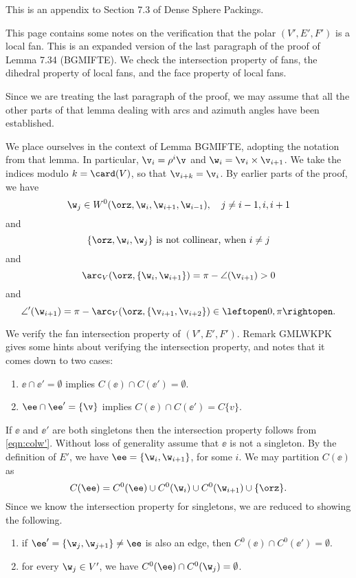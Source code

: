 \newpage
{}

This is an appendix to Section 7.3 of Dense Sphere Packings.

This page contains some notes on the verification that the polar $(V',E',F')$ is
a local fan.   This is an expanded version of  the last paragraph
of the proof of Lemma 7.34 (BGMIFTE).
We check the intersection property of fans, the dihedral property
of local fans, and the face property of local fans.

Since we are treating the last paragraph of the
proof, we may assume that all the other parts of that lemma dealing
with arcs and azimuth angles have been established.

We place ourselves in the context of Lemma BGMIFTE, adopting the
notation from that lemma.  
In particular, $\v_i = \rho^i\v$ and
$\w_i = \v_i \times \v_{i+1}$.  
We take the indices modulo $k=\card(V)$, so that $\v_{i+k}=\v_i$.
By earlier parts of the proof, we have
\begin{equation}\label{eqn:wj'}
\w_j\in W^0(\orz,\w_{i},\w_{i+1},\w_{i-1}),\quad j\ne i-1, i, i+1
\end{equation}
and
\begin{equation}\label{eqn:colw'}
\{\orz,\w_i,\w_j\} \text{ is not collinear, when } i\ne j
\end{equation}  
and
\begin{equation}\label{eqn:arcV'}
\arc_V(\orz,\{\w_i,\w_{i+1}\}) 
=\pi - \angle(\v_{i+1}) >0
\end{equation}
and
\begin{equation}\label{eqn:angle'}
\angle'(\w_{i+1}) 
=\pi -\arc_V(\orz,\{\v_{i+1},\v_{i+2}\})  \in\leftopen 0,\pi\rightopen.
\end{equation}

We verify the fan intersection property of $(V',E',F')$.  Remark GMLWKPK gives
some hints about verifying the intersection property, and notes that it comes
down to two cases:
\begin{enumerate}
\item $\ee\cap \ee' = \emptyset$ implies $C(\ee)\cap C(\ee') = \emptyset$.
\item $\ee\cap\ee' = \{\v\}$ implies $C(\ee)\cap C(\ee') = C\{v\}$.
\end{enumerate}
If $\ee$ and $\ee'$ are both singletons then the intersection property
follows from \eqref{eqn:colw'}.  Without loss of generality assume that $\ee$ is
not a singleton.  By the definition of $E'$, we have 
 $\ee=\{\w_i,\w_{i+1} \}$, for some $i$.  We may partition $C(\ee)$ as
\[
C(\ee) = C^0(\ee) \cup C^0(\w_i) \cup C^0(\w_{i+1})\cup \{\orz\}.
\]
Since we know the intersection property for singletons, we are reduced to showing
the following.
\begin{enumerate}
\item if $\ee'=\{\w_j,\w_{j+1}\}\ne\ee$ is also an edge, then  $C^0(\ee)\cap C^0(\ee')=\emptyset$.
\item for every $\w_j\in V'$, we have $C^0(\ee) \cap C^0(\w_j)=\emptyset$.
\end{enumerate}

